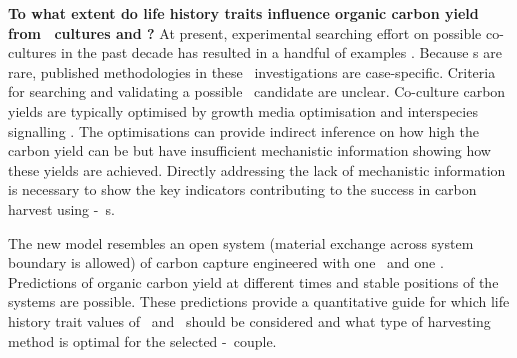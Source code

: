 \documentclass[../thesis.tex]{subfiles} %
\begin{document}
\textbf{To what extent do life history traits influence organic carbon yield from \phy\ cultures and \pbs?}  At present, experimental searching effort on possible co-cultures in the past decade has resulted in a handful of examples \autocite{fuentes2016impact,santos2014microalgal}.  Because \pbs s are rare, published methodologies in these \pbs\ investigations are case-specific.  Criteria for searching and validating a possible \phy\/\bacm\ candidate are unclear.  Co-culture carbon yields are typically optimised by growth media optimisation \autocite{aytekin2016statistical,fuentes2016impact} and interspecies signalling \autocite{fuentes2016impact}.  The optimisations can provide indirect inference on how high the carbon yield can be but have insufficient mechanistic information showing how these yields are achieved.  Directly addressing the lack of mechanistic information is necessary to show the key indicators contributing to the success in carbon harvest using \phy-\bac\ \pbs s.

The new model resembles an open system (material exchange across system boundary is allowed) of carbon capture engineered with one \phy\ and one \bacm.  Predictions of organic carbon yield at different times and stable positions of the systems are possible.  These predictions provide a quantitative guide for which life history trait values of \phy\ and \bac\ should be considered and what type of harvesting method is optimal for the selected \phy-\bac\ couple.
\end{document}
